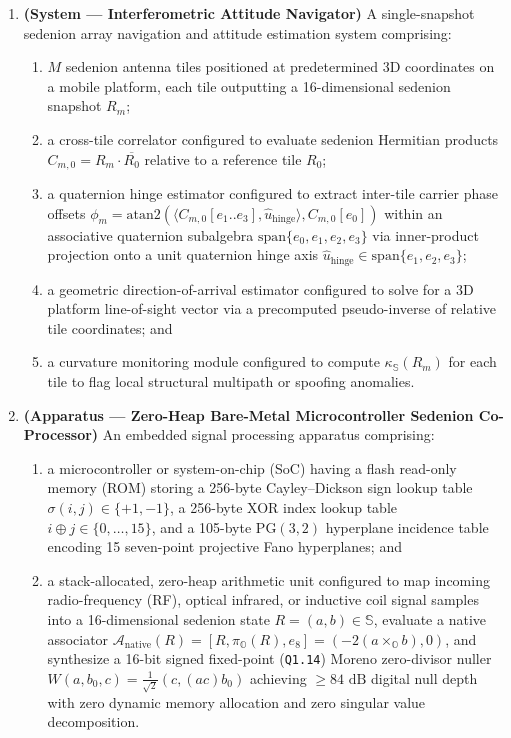 \documentclass[12pt,letterpaper]{article}
\begin{document}
\begin{enumerate}[leftmargin=20pt,itemsep=4pt]
    \item \textbf{(System --- Interferometric Attitude Navigator)} A single-snapshot sedenion array navigation and attitude estimation system comprising:
    \begin{enumerate}[leftmargin=16pt,itemsep=1pt]
        \item $M$ sedenion antenna tiles positioned at predetermined 3D coordinates on a mobile platform, each tile outputting a 16-dimensional sedenion snapshot $R_m$;
        \item a cross-tile correlator configured to evaluate sedenion Hermitian products $C_{m,0} = R_m \cdot \overline{R_0}$ relative to a reference tile $R_0$;
        \item a quaternion hinge estimator configured to extract inter-tile carrier phase offsets $\phi_m = \mathrm{atan2}(\langle C_{m,0}[e_1..e_3], \hat{u}_{\mathrm{hinge}}\rangle, C_{m,0}[e_0])$ within an associative quaternion subalgebra $\mathrm{span}\{e_0, e_1, e_2, e_3\}$ via inner-product projection onto a unit quaternion hinge axis $\hat{u}_{\mathrm{hinge}} \in \mathrm{span}\{e_1, e_2, e_3\}$;
        \item a geometric direction-of-arrival estimator configured to solve for a 3D platform line-of-sight vector via a precomputed pseudo-inverse of relative tile coordinates; and
        \item a curvature monitoring module configured to compute $\kappa_{\mathbb{S}}(R_m)$ for each tile to flag local structural multipath or spoofing anomalies.
    \end{enumerate}

    \item \textbf{(Apparatus --- Zero-Heap Bare-Metal Microcontroller Sedenion Co-Processor)} An embedded signal processing apparatus comprising:
    \begin{enumerate}[leftmargin=16pt,itemsep=1pt]
        \item a microcontroller or system-on-chip (SoC) having a flash read-only memory (ROM) storing a 256-byte Cayley--Dickson sign lookup table $\sigma(i,j) \in \{+1,-1\}$, a 256-byte XOR index lookup table $i \oplus j \in \{0,\dots,15\}$, and a 105-byte $\mathrm{PG}(3,2)$ hyperplane incidence table encoding 15 seven-point projective Fano hyperplanes; and
        \item a stack-allocated, zero-heap arithmetic unit configured to map incoming radio-frequency (RF), optical infrared, or inductive coil signal samples into a 16-dimensional sedenion state $R = (a, b) \in \mathbb{S}$, evaluate a native associator $\mathcal{A}_{\mathrm{native}}(R) = [R, \pi_{\mathbb{O}}(R), e_8] = (-2(a\times_{\mathbb{O}} b), 0)$, and synthesize a 16-bit signed fixed-point (\texttt{Q1.14}) Moreno zero-divisor nuller $W(a,b_0,c) = \frac{1}{\sqrt{2}}(c, (ac)b_0)$ achieving $\ge 84\text{ dB}$ digital null depth with zero dynamic memory allocation and zero singular value decomposition.
    \end{enumerate}


\end{enumerate}
\end{document}

